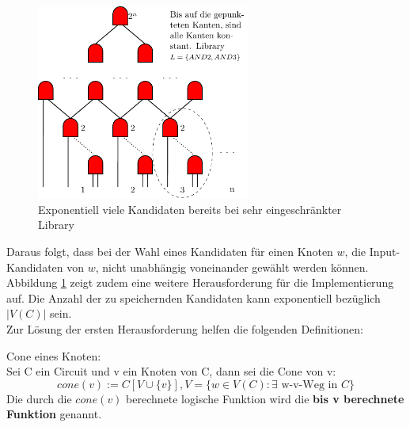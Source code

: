 \documentclass[11pt, a4paper, german]{article}
\begin{document}
\begin{figure}%
\includegraphics[width= 7cm]{pictures/compiled/expo_kand}
\caption{Exponentiell viele Kandidaten bereits bei sehr eingeschränkter Library}
\label{bild:expo_kan}
\end{figure}
 Daraus folgt, dass bei der Wahl eines Kandidaten für einen Knoten $w$, die  Input-Kandidaten von $w$, nicht unabhängig voneinander gewählt werden können. \\
Abbildung \ref{bild:expo_kan} zeigt zudem eine weitere Herausforderung für die Implementierung auf. Die Anzahl der zu speichernden Kandidaten kann  exponentiell bezüglich $|V(C)|$ sein. \\
Zur Lösung der ersten Herausforderung helfen die folgenden Definitionen:\\

\begin{definition}{Cone eines Knoten:}\\
	Sei C ein Circuit und v ein Knoten von C, dann sei die Cone von v: 
	\[ cone(v) := C[V \cup \{ v \}], V = \{ w \in V(C) : \exists \text{ w-v-Weg in }  C \} \] 
	Die durch die $cone(v)$ berechnete logische Funktion wird die	{\bf bis v berechnete Funktion} genannt.
\end{definition}
\end{document}
